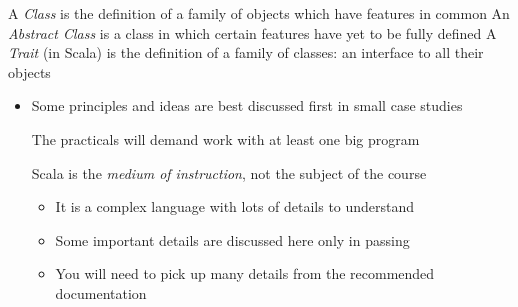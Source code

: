 \documentclass{ip3}
\begin{document}
\begin{foil}
\begin{itemize}
\vitem A \textit{Class} is the definition of a family of objects which have features in common
\vitem An \textit{Abstract Class} is a class in which certain features have yet to be fully defined
\vitem A \textit{Trait} (in Scala) is the definition of a family of classes: an interface to all their objects
\end{itemize}
\end{foil}

\begin{foil}[Caveat]
\begin{itemize}


\item Some principles and ideas are best discussed first in small case studies

\vitem The practicals will demand work with at least one big program

\vitem Scala is the \textit{medium of instruction}, not the subject of the course
\begin{itemize}
\item It is a complex language with lots of details to understand
\item Some important details are discussed here only in passing
\item You will need to pick up many details from the recommended documentation
\end{itemize}
\end{itemize}
\end{foil}
\end{document}
